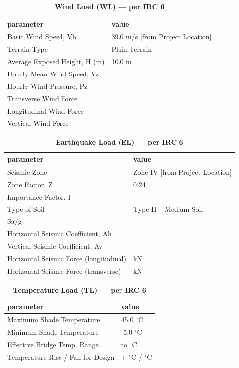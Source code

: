 \documentclass[12pt,a4paper]{report}
\numberwithin{table}{chapter}
\numberwithin{figure}{chapter}
\begin{document}
\vspace{1em}
\begin{longtable}{|L{5.5cm}|p{10.0cm}|}
\caption{\textbf{Wind Load (WL) --- per IRC 6}}
\hline
\textbf{parameter} & \textbf{value} \\
\hline
\textnormal{Basic Wind Speed, Vb} & 39.0 m/s [from Project Location] \\[6pt]
\hline
\textnormal{Terrain Type} & Plain Terrain \\[6pt]
\hline
\textnormal{Average Exposed Height, H (m)} & 10.0 m \\[6pt]
\hline
\textnormal{Hourly Mean Wind Speed, Vz} &  \\[6pt]
\hline
\textnormal{Hourly Wind Pressure, Pz} &  \\[6pt]
\hline
\textnormal{Transverse Wind Force} &  \\[6pt]
\hline
\textnormal{Longitudinal Wind Force} &  \\[6pt]
\hline
\textnormal{Vertical Wind Force} &  \\[6pt]
\hline
\end{longtable}

\vspace{1em}
\begin{longtable}{|L{5.5cm}|p{10.0cm}|}
\caption{\textbf{Earthquake Load (EL) --- per IRC 6}}
\hline
\textbf{parameter} & \textbf{value} \\
\hline
\textnormal{Seismic Zone} & Zone IV [from Project Location] \\[6pt]
\hline
\textnormal{Zone Factor, Z} & 0.24 \\[6pt]
\hline
\textnormal{Importance Factor, I} &  \\[6pt]
\hline
\textnormal{Type of Soil} & Type II – Medium Soil \\[6pt]
\hline
\textnormal{Sa/g} &  \\[6pt]
\hline
\textnormal{Horizontal Seismic Coefficient, Ah} &  \\[6pt]
\hline
\textnormal{Vertical Seismic Coefficient, Av} &  \\[6pt]
\hline
\textnormal{Horizontal Seismic Force (longitudinal)} &  kN \\[6pt]
\hline
\textnormal{Horizontal Seismic Force (transverse)} &  kN \\[6pt]
\hline
\end{longtable}

\vspace{1em}
\begin{longtable}{|L{5.5cm}|p{10.0cm}|}
\caption{\textbf{Temperature Load (TL) --- per IRC 6}}
\hline
\textbf{parameter} & \textbf{value} \\
\hline
\textnormal{Maximum Shade Temperature} & 45.0 $^\circ$C \\[6pt]
\hline
\textnormal{Minimum Shade Temperature} & -5.0 $^\circ$C \\[6pt]
\hline
\textnormal{Effective Bridge Temp. Range} &  to  $^\circ$C \\[6pt]
\hline
\textnormal{Temperature Rise / Fall for Design} & + $^\circ$C / \textminus{} $^\circ$C \\[6pt]
\hline
\end{longtable}
\end{document}
